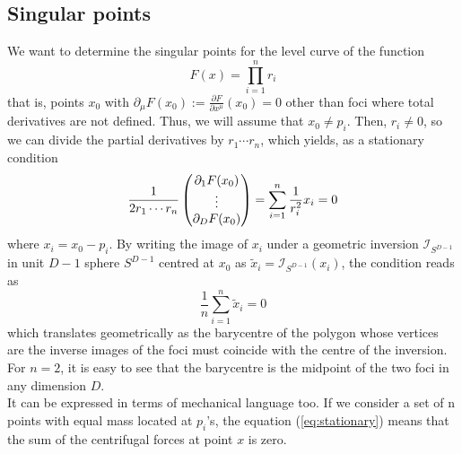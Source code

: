\documentclass{article}
\begin{document}
\subsection{Singular points}
\label{sec-1-7}
We want to determine the singular points for the level curve of the function
\begin{equation}
\label{ }
F(x) =  \prod_{i=1}^{n} r_i 
\end{equation}
that is, points $x_0$ with $\partial_{\mu} F(x_0) := \frac{\partial F}{\partial x^{\mu}}(x_0)= 0$ other than foci where total derivatives are not defined. Thus, we will assume that $x_0 \ne p_i$. Then, $r_i \ne 0$, so we can divide the partial derivatives by $r_1 \cdots r_n$, which yields, as a stationary condition
\begin{equation}
\label{eq:stationary}
\frac{1}{2r_1 \cdots r_n}\left( \begin{matrix} {\partial_1 F(x_0)}\\ {\vdots}\\ {\partial_D F(x_0)}\\ \end{matrix} \right) = \sum_{i=1}^{n} \frac{1}{r_i^2} x_i =0
\end{equation}
where $x_i = x_0-p_i$. By writing the image of $x_i$ under a geometric inversion $\mathcal{I}_{S^{D-1}}$ in unit $D-1$ sphere $S^{D-1}$ centred at $x_0$ as $\tilde{x}_i = \mathcal{I}_{S^{D-1}}(x_i)$, the condition reads as
\begin{equation}
\label{ }
\frac{1}{n}\sum_{i=1}^{n} \tilde{x}_i =0
\end{equation}
which translates geometrically as the barycentre of the polygon whose vertices are the inverse images of the foci must coincide with the centre of the inversion. For $n=2$, it is easy to see that the barycentre is the midpoint of the two foci in any dimension $D$.\\
It can be expressed in terms of mechanical language too. If we consider a set of n points with equal mass located at $p_i$'s, the equation (\ref{eq:stationary}) means that the sum of the centrifugal forces at point $x$ is zero.
\end{document}
